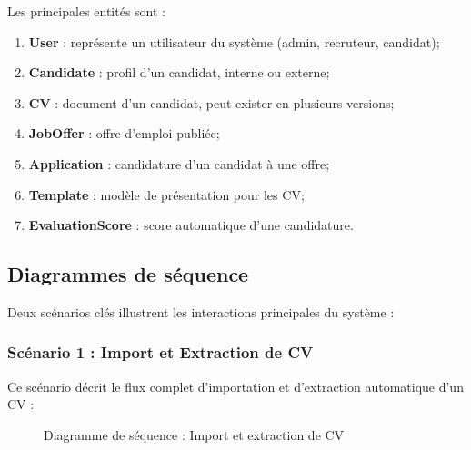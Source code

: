 Les principales entités sont :

\begin{enumerate}
    \item \textbf{User} : représente un utilisateur du système (admin, recruteur, candidat);
    
    \item \textbf{Candidate} : profil d'un candidat, interne ou externe;
    
    \item \textbf{CV} : document d'un candidat, peut exister en plusieurs versions;
    
    \item \textbf{JobOffer} : offre d'emploi publiée;
    
    \item \textbf{Application} : candidature d'un candidat à une offre;
    
    \item \textbf{Template} : modèle de présentation pour les CV;
    
    \item \textbf{EvaluationScore} : score automatique d'une candidature.
\end{enumerate}


\subsection{Diagrammes de séquence}
\label{subsec:diagrammes-sequence}

Deux scénarios clés illustrent les interactions principales du système :

\subsubsection{Scénario 1 : Import et Extraction de CV}
\label{subsubsec:scenario1-import-cv}

Ce scénario décrit le flux complet d'importation et d'extraction automatique d'un CV :

\begin{figure}[!ht]
    \centering
    \caption{Diagramme de séquence : Import et extraction de CV}
    \label{fig:sequence-import-cv}
\end{figure}

